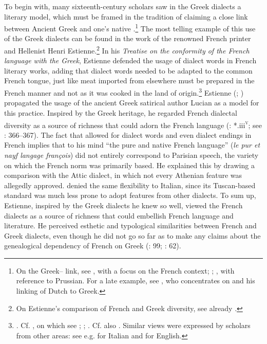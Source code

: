 To begin with, many sixteenth-century scholars saw in the Greek dialects a literary model, which must be framed in the tradition of claiming a close link between Ancient Greek and one’s native .\footnote{On the Greek– link, see \citet{Demaiziere1982}, with a focus on the French context; \citet{Trapp1990}; \citet{Dini2004}, with reference to Prussian. For a late example, see \citet[435--436]{VanHal2016}, who concentrates on \citet[119--132]{Reitz1730} and his linking of Dutch to Greek.} The most telling example of this use of the Greek dialects can be found in the work of the renowned French printer and Hellenist Henri Estienne.\footnote{On Estienne’s comparison of French and Greek diversity, see already \citet[70]{Demaiziere1988}.} In his \textit{Treatise on the conformity of the French language with the Greek}, Estienne defended the usage of dialect words in French literary works, adding that dialect words needed to be adapted to the common French tongue, just like meat imported from elsewhere must be prepared in the French manner and not as it was cooked in the land of origin.\footnote{\citet[¶¶.ii\textsc{\textsuperscript{v}}]{Estienne1565}. Cf. \citet[\texttt{\char"2720}\textsc{\textsuperscript{r}}]{Ronsard1550}, on which see \citet[170]{Alinei1984}; \citet[24]{Barbier-mueller1990}; \citet[14]{Trapp1990}. Cf. also \citet[456, 458]{Mambrun1661}. Similar views were expressed by scholars from other areas: see e.g. \citet[\textsc{e.}iii\textsc{\textsuperscript{v}}–\textsc{e.}iv\textsc{\textsuperscript{r}}]{Oreadini1525} for Italian and \citet[\textsc{a}.vi\textsc{\textsuperscript{r}}]{Craige1606} for English.} Estienne (\citeyear[133]{Estienne1579}; \citeyear[*.iii\textsc{\textsuperscript{v}}–*.iiii\textsc{\textsuperscript{r}}]{Estienne1582}) propagated the usage of the ancient Greek satirical author Lucian as a model for this practice. Inspired by the Greek heritage, he regarded French dialectal diversity as a source of richness that could adorn the French language (\citealt{Estienne1582}: *.iii\textsc{\textsuperscript{v}}; see \citealt{Auroux1992}: 366–367). The fact that \citet[143]{Estienne1579} allowed for dialect words and even dialect endings in French implies that to his mind “the pure and native French language” (\textit{le pur et nayf langage françois}) did not entirely correspond to Parisian speech, the variety on which the French norm was primarily based. He explained this by drawing a comparison with the Attic dialect, in which not every Athenian feature was allegedly approved. \citet[133--134]{Estienne1579} denied the same flexibility to Italian, since its Tuscan-based standard was much less prone to adopt features from other dialects. To sum up, Estienne, inspired by the Greek dialects he knew so well, viewed the French dialects as a source of richness that could embellish French language and literature. He perceived esthetic and typological similarities between French and Greek dialects, even though he did not go so far as to make any claims about the genealogical dependency of French on Greek (\citealt{Droixhe1978}: 99; \citealt{Considine2008a}: 62).

